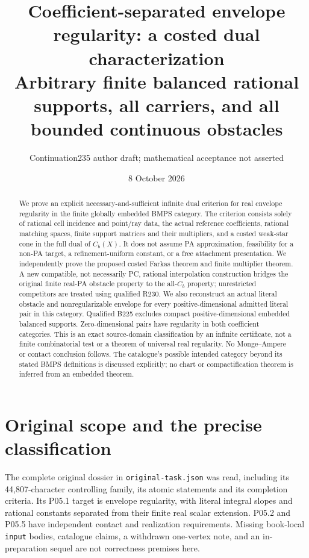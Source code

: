 \documentclass[11pt]{article}
\title{Coefficient-separated envelope regularity: a costed dual characterization\\
\large Arbitrary finite balanced rational supports, all carriers, and all bounded continuous obstacles}
\author{Continuation235 author draft; mathematical acceptance not asserted}
\date{8 October 2026}
\begin{document}
\maketitle
\begin{abstract}
We prove an explicit necessary-and-sufficient infinite dual criterion for real envelope regularity in the finite globally embedded BMPS category. The criterion consists solely of rational cell incidence and point/ray data, the actual reference coefficients, rational matching spaces, finite support matrices and their multipliers, and a costed weak-star cone in the full dual of $C_b(X)$. It does not assume PA approximation, feasibility for a non-PA target, a refinement-uniform constant, or a free attachment presentation. We independently prove the proposed costed Farkas theorem and finite multiplier theorem. A new compatible, not necessarily PC, rational interpolation construction bridges the original finite real-PA obstacle property to the all-$C_b$ property; unrestricted competitors are treated using qualified R230. We also reconstruct an actual literal obstacle and nonregularizable envelope for every positive-dimensional admitted literal pair in this category. Qualified B225 excludes compact positive-dimensional embedded balanced supports. Zero-dimensional pairs have regularity in both coefficient categories. This is an exact source-domain classification by an infinite certificate, not a finite combinatorial test or a theorem of universal real regularity. No Monge--Ampere or contact conclusion follows. The catalogue's possible intended category beyond its stated BMPS definitions is discussed explicitly; no chart or compactification theorem is inferred from an embedded theorem.
\end{abstract}
\tableofcontents

\section{Original scope and the precise classification}
The complete original dossier in \texttt{original-task.json} was read, including its 44,807-character controlling family, its atomic statements and its completion criteria. Its P05.1 target is envelope regularity, with literal integral slopes and rational constants separated from their finite real scalar extension. P05.2 and P05.5 have independent contact and realization requirements. Missing book-local \texttt{input} bodies, catalogue claims, a withdrawn one-vertex note, and an in-preparation sequel are not correctness premises here.
\end{document}
